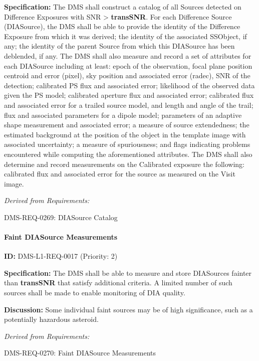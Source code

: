 \documentclass[SE,toc,lsstdraft]{lsstdoc}
\begin{document}
\textbf{Specification:} The DMS shall construct a catalog of all Sources detected on Difference Exposures with SNR > \textbf{transSNR}. For each Difference Source (DIASource), the DMS shall be able to provide the identity of the Difference Exposure from which it was derived; the identity of the associated SSObject, if any; the identity of the parent Source from which this DIASource has been deblended, if any. The DMS shall also measure and record a set of attributes for each DIASource including at least: epoch of the observation, focal plane position centroid and error (pixel), sky position and associated error (radec), SNR of the detection; calibrated PS flux and associated error; likelihood of the observed data given the PS model; calibrated aperture flux and associated error; calibrated flux and associated error for a trailed source model, and length and angle of the trail; flux and associated parameters for a dipole model; parameters of an adaptive shape measurement and associated error; a measure of source extendedness; the estimated background at the position of the object in the template image with associated uncertainty; a measure of spuriousness; and flags indicating problems encountered while computing the aforementioned attributes. The DMS shall also determine and record measurements on the Calibrated exposure the following: calibrated flux and associated error for the source as measured on the Visit image.

\emph{Derived from Requirements:}

DMS-REQ-0269:
DIASource Catalog \newline

\paragraph{Faint DIASource Measurements}\hfill  %

\label{DMS-L1-REQ-0017}
\textbf{ID:} DMS-L1-REQ-0017 (Priority: 2)

\textbf{Specification:} The DMS shall be able to measure and store DIASources fainter than \textbf{transSNR }that satisfy additional criteria. A limited number of such sources shall be made to enable monitoring of DIA quality.

\textbf{Discussion: }Some individual faint sources may be of high significance, such as a potentially hazardous asteroid.

\emph{Derived from Requirements:}

DMS-REQ-0270:
Faint DIASource Measurements \newline
\end{document}
